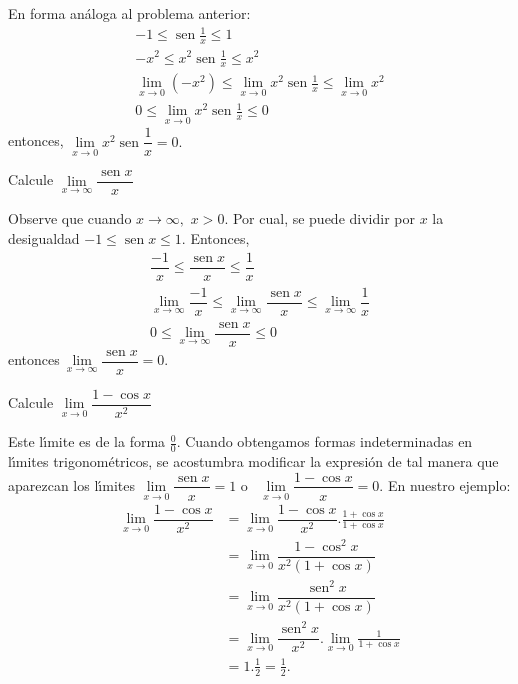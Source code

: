 \begin{sol}
En forma an\'{a}loga al problema anterior:%
\begin{gather*}
-1\leq\operatorname{sen}\frac{1}{x}\leq1\\
-x^{2}\leq x^{2}\operatorname{sen}\frac{1}{x}\leq x^{2}\\
\lim\limits_{x\rightarrow0}(-x^{2})\leq\lim\limits_{x\rightarrow0}%
x^{2}\operatorname{sen}\frac{1}{x}\leq\lim\limits_{x\rightarrow0}x^{2}\\
0\leq\lim\limits_{x\rightarrow0}x^{2}\operatorname{sen}\frac{1}{x}\leq0
\end{gather*}
entonces, $\lim\limits_{x\rightarrow0}x^{2}\operatorname{sen}\dfrac{1}{x}=0.$
\end{sol}

\begin{example}
\label{p7}Calcule $\lim\limits_{x\rightarrow\infty}\dfrac{\operatorname{sen}%
x}{x}$
\end{example}

\begin{sol}
Observe que cuando $x\rightarrow\infty,$ $x>0$. Por cual, se puede dividir por
$x$ la desigualdad $-1\leq\operatorname{sen}x\leq1.$ Entonces,%
\begin{gather*}
\dfrac{-1}{x}\leq\dfrac{\operatorname{sen}x}{x}\leq\dfrac{1}{x}\\
\lim\limits_{x\rightarrow\infty}\dfrac{-1}{x}\leq\lim\limits_{x\rightarrow
\infty}\dfrac{\operatorname{sen}x}{x}\leq\lim\limits_{x\rightarrow\infty
}\dfrac{1}{x}\\
0\leq\lim\limits_{x\rightarrow\infty}\dfrac{\operatorname{sen}x}{x}\leq0
\end{gather*}
entonces$\ \lim\limits_{x\rightarrow\infty}\dfrac{\operatorname{sen}x}{x}=0.$
\end{sol}

\begin{example}
Calcule $\lim\limits_{x\rightarrow0}\dfrac{1-\cos x}{x^{2}}$
\end{example}

\begin{sol}
Este l\'{\i}mite es de la forma $\frac{0}{0}.$ Cuando obtengamos formas
indeterminadas en l\'{\i}mites trigonom\'{e}tricos, se acostumbra modificar la
expresi\'{o}n de tal manera que aparezcan los l\'{\i}mites $\lim
\limits_{x\rightarrow0}\dfrac{\operatorname{sen}x}{x}=1$ o \ $\lim
\limits_{x\rightarrow0}\dfrac{1-\cos x}{x}=0.$ En nuestro ejemplo:%
\begin{align*}
\lim\limits_{x\rightarrow0}\dfrac{1-\cos x}{x^{2}}  &  =\lim
\limits_{x\rightarrow0}\dfrac{1-\cos x}{x^{2}}.\frac{1+\cos x}{1+\cos x}\\
&  =\lim\limits_{x\rightarrow0}\dfrac{1-\cos^{2}x}{x^{2}(1+\cos x)}\\
&  =\lim\limits_{x\rightarrow0}\dfrac{\operatorname{sen}^{2}x}{x^{2}(1+\cos
x)}\\
&  =\lim\limits_{x\rightarrow0}\dfrac{\operatorname{sen}^{2}x}{x^{2}}%
.\lim\limits_{x\rightarrow0}\frac{1}{1+\cos x}\\
&  =1.\frac{1}{2}=\frac{1}{2}.
\end{align*}

\end{sol}

